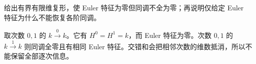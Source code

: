 \begin{exercise}\label{b4:ex:05-euler-zero-insufficient}
给出有界有限维复形，使 Euler 特征为零但同调不全为零；再说明仅给定 Euler 特征为什么不能恢复各阶同调。
\end{exercise}
\begin{solution}
取次数 \(0,1\) 的 \(k\xrightarrow0k\)。它有 \(H^0=H^1=k\)，而 Euler 特征为零。次数 \(0,1\) 的 \(k\xrightarrow1k\) 则同调全零且有相同 Euler 特征。交错和会把相邻次数的维数抵消，所以不能保留全部逐次信息。
\end{solution}
